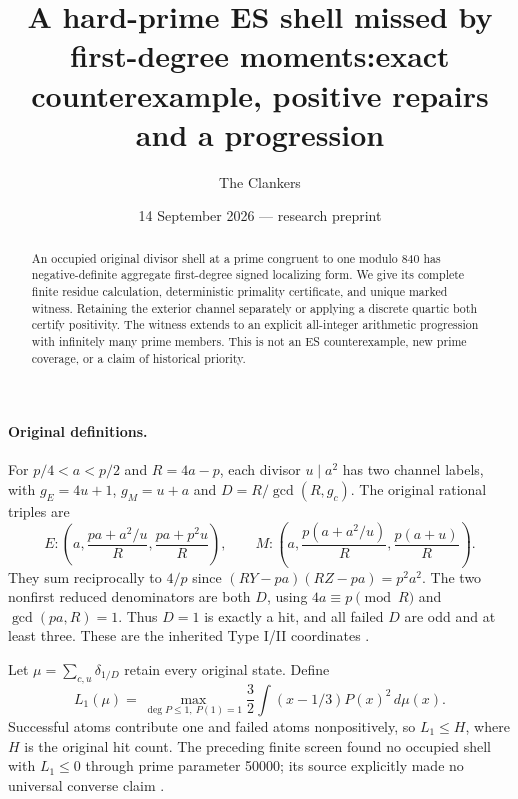 \documentclass[10pt,a4paper]{article}
\title{A hard-prime ES shell missed by first-degree moments:\newline exact counterexample, positive repairs and a progression}
\author{The Clankers}
\date{14 September 2026 --- research preprint}
\begin{document}
\maketitle
\begin{abstract}
An occupied original divisor shell at a prime congruent to one modulo 840 has
negative-definite aggregate first-degree signed localizing form. We give its
complete finite residue calculation, deterministic primality certificate, and
unique marked witness. Retaining the exterior channel separately or applying
a discrete quartic both certify positivity. The witness extends to an explicit
all-integer arithmetic progression with infinitely many prime members. This
is not an ES counterexample, new prime coverage, or a claim of historical priority.
\end{abstract}

\paragraph{Original definitions.}
For $p/4<a<p/2$ and $R=4a-p$, each divisor $u\mid a^2$ has two channel labels,
with $g_E=4u+1$, $g_M=u+a$ and $D=R/\gcd(R,g_c)$. The original rational
triples are
\[
 E:\left(a,\frac{pa+a^2/u}R,\frac{pa+p^2u}R\right),\qquad
 M:\left(a,\frac{p(a+a^2/u)}R,\frac{p(a+u)}R\right).
\]
They sum reciprocally to $4/p$ since $(RY-pa)(RZ-pa)=p^2a^2$.
The two nonfirst reduced denominators are both $D$, using $4a\equiv p\pmod R$
and $\gcd(pa,R)=1$. Thus $D=1$ is exactly a hit, and all failed $D$ are odd
and at least three. These are the inherited Type I/II coordinates \cite{ET}.

Let $\mu=\sum_{c,u}\delta_{1/D}$ retain every original state. Define
\[
 L_1(\mu)=\max_{\deg P\le1,\ P(1)=1}
 \frac32\int(x-1/3)P(x)^2\,d\mu(x).
 \tag{1}
\]
Successful atoms contribute one and failed atoms nonpositively, so $L_1\le H$,
where $H$ is the original hit count. The preceding finite screen found no
occupied shell with $L_1\le0$ through prime parameter 50000; its source
explicitly made no universal converse claim \cite{Prior}.
\end{document}
